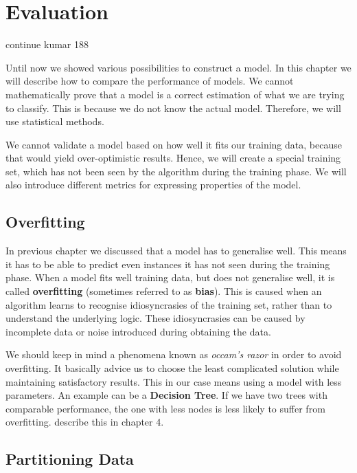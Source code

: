 \chapter{Evaluation}
continue kumar 188

\label{chap:eval}

Until now we showed various possibilities to construct a model.
In this chapter we will describe how to compare the performance of models.
We cannot mathematically prove that a model is a correct estimation of what we are trying to classify.
This is because we do not know the actual model.
Therefore, we will use statistical methods.

We cannot validate a model based on how well it fits our training data, because that would yield over-optimistic results.
Hence, we will create a special training set, which has not been seen by the algorithm during the training phase.
We will also introduce different metrics for expressing properties of the model.

\section{Overfitting}

In previous chapter  we discussed that a model has to generalise well. This means it has to be able to predict even
instances it has not seen during the training phase. When a model fits well training data, but does not generalise well, it is called
{\bf overfitting} (sometimes referred to as {\bf bias}).
This is caused when an algorithm learns to recognise idiosyncrasies of the training set, rather than to understand the underlying logic.
These idiosyncrasies can be caused by incomplete data or noise introduced during obtaining the data.

We should keep in mind a phenomena known as {\it occam's razor} in order to avoid overfitting. 
It basically advice us to choose the least complicated solution while
maintaining satisfactory results.
This in our case means using a model with less parameters. An example can be a {\bf Decision Tree}.
If we have two trees with comparable performance, the one with less nodes is less likely to suffer from overfitting. \citet{TanBachKum08} describe this in chapter 4.


\section{Partitioning Data}

